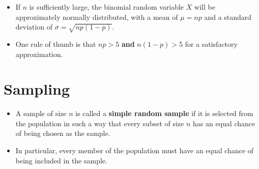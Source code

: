\documentclass[12pt,a4paper,titlepage]{article}
\begin{document}
            \begin{SummaryBox}[title=Normal approximation of a binomial distribution]
                \begin{itemize}[leftmargin=*]
                    \item If $n$ is sufficiently large, the binomial random variable $X$ will be approximately normally distributed, with a mean of $\mu = np$ and a standard deviation of $\sigma = \sqrt{np(1-p)}$.
                    \item One rule of thumb is that $np > 5$ \textbf{and} $n(1-p) > 5$ for a satisfactory approximation.
                \end{itemize}
            \end{SummaryBox}
            
            \pagebreak
            
        \section{Sampling}
            
            \begin{SummaryBox}[title=Sample]
                \begin{itemize}[leftmargin=*]
                    \item A sample of size $n$ is called a \textbf{simple random sample} if it is selected from the population in such a way that every subset of size $n$ has an equal chance of being chosen as the sample.
                    \item In particular, every member of the population must have an equal chance of being included in the sample.
                \end{itemize}
            \end{SummaryBox}
            
\end{document}

